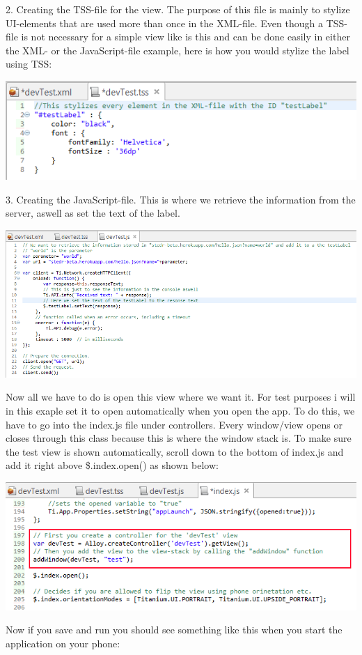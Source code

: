 2. Creating the TSS-file for the view. The purpose of this file is mainly to stylize UI-elements that are used more than once in the XML-file. Even though a TSS-file is not necessary for a simple view like is this and can be done easily in either the XML- or the JavaScript-file example, here is how you would stylize the label using TSS: 

\begin{center}
\includegraphics[scale=0.45]{guide/f8.png} 
\end{center}

3. Creating the JavaScript-file. This is where we retrieve the information from the server, aswell as set the text of the label.

\begin{center}
\includegraphics[scale=0.45]{guide/f9.png} 
\end{center}

Now all we have to do is open this view where we want it. For test purposes i will in this exaple set it to open automatically when you open the app. To do this, we have to go into the index.js file under controllers. Every window/view opens or closes through this class because this is where the window stack is. To make sure the test view is shown automatically, scroll down to the bottom of index.js and add it right above \$.index.open() as shown below:

\begin{center}
\includegraphics[scale=0.45]{guide/f10.png} 
\end{center}
Now if you save and run you should see something like this when you start the application on your phone:

